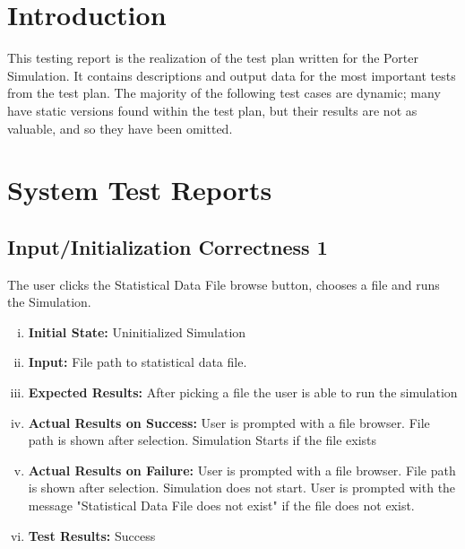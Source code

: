 \documentclass[paper=letter, fontsize=10pt]{scrartcl}
\numberwithin{equation}{section}		%
\numberwithin{figure}{section}			%
\numberwithin{table}{section}				%
\begin{document}
\section{Introduction}
This testing report is the realization of the test plan written for the Porter Simulation. It contains descriptions and output data for the most important tests from the test plan. The majority of the following test cases are dynamic; many have static versions found within the test plan, but their results are not as valuable, and so they have been omitted.

\section{System Test Reports}
\subsection{Input/Initialization Correctness 1}
The user clicks the Statistical Data File browse button, chooses a file and runs the Simulation. 
\begin{enumerate}[(i)]
	\item \textbf{Initial State:} Uninitialized Simulation   
	\item \textbf{Input:} File path to statistical data file.
	\item \textbf{Expected Results:} After picking a file the user is able to run the simulation 
	\item \textbf{Actual Results on Success:} User is prompted with a file browser. File path is shown after selection. Simulation Starts if the file exists
	\item \textbf{Actual Results on Failure:} User is prompted with a file browser. File path is shown after selection. Simulation does not start. User is prompted with the message "Statistical Data File does not exist" if the file does not exist.
	\item \textbf{Test Results:} Success
\end{enumerate}
	
\end{document}

